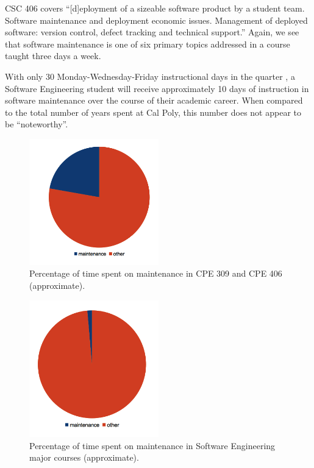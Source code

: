 \documentclass[11pt]{article}
\begin{document}
\begin{multicols}{2}
CSC 406 covers ``[d]eployment of a sizeable software product by a student team. Software maintenance and deployment economic issues. Management of deployed  software: version control, defect tracking and technical support.'' \cite{catalogCourses}  Again, we see that software maintenance is one of six primary topics addressed in a course taught three days a week. \cite{406Schedule}

With only 30 Monday-Wednesday-Friday instructional days in the quarter \cite{polyCalendar}, a Software Engineering student will receive approximately 10 days of instruction in software maintenance over the course of their academic career.  When compared to the total number of years spent at Cal Poly, this number does not appear to be ``noteworthy''.

\begin{figure}[tbp!]
  \caption{Percentage of time spent on maintenance in CPE 309 and CPE 406 (approximate).}
  \centering
    \includegraphics[width=0.5\textwidth]{termpaper/images/pie-chart-01}
\end{figure}

\begin{figure}[tbp!]
  \caption{Percentage of time spent on maintenance in Software Engineering major courses (approximate).}
  \centering
    \includegraphics[width=0.5\textwidth]{termpaper/images/pie-chart-02}
\end{figure}


\end{multicols}
\end{document}
